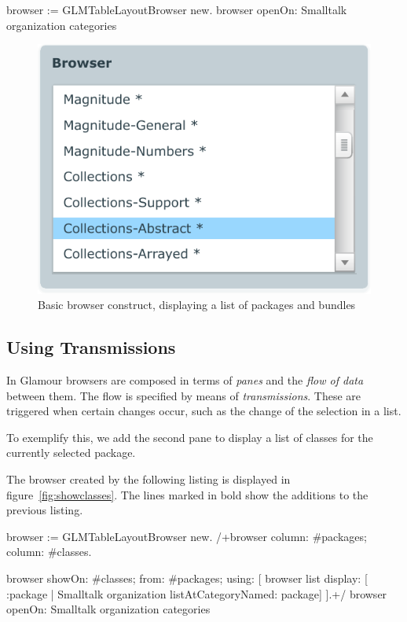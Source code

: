 \documentclass[a4paper,10pt,twoside]{book}
\begin{document}
\begin{code}{}
browser := GLMTableLayoutBrowser new.
browser openOn: Smalltalk organization  categories
\end{code}

\begin{figure}[htbp]
\centerline{\includegraphics[width=\linewidth]{helloworld.pdf}}
\caption{Basic browser construct, displaying a list of packages and bundles}
\label{fig:helloworld}
\end{figure}

\subsection{Using Transmissions}

In Glamour browsers are composed in terms of \emph{panes} and the
\emph{flow of data} between them. The flow is specified by means of
\emph{transmissions}. These are triggered when certain changes occur,
such as the change of the selection in a list.

To exemplify this, we add the second pane to display a list of classes
for the currently selected package.

The browser created by the following listing is displayed in
figure~\ref{fig:showclasses}. The lines marked in bold show the
additions to the previous listing.

\begin{code}{}
browser := GLMTableLayoutBrowser new.
/+browser
	column: #packages;
	column: #classes.

browser showOn: #classes; from: #packages; using: [
	browser list
		display: [ :package | Smalltalk organization listAtCategoryNamed: package]
].+/
browser openOn: Smalltalk organization categories
\end{code}
\end{document}
